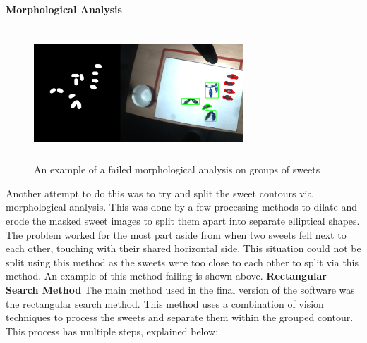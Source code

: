 \textbf{Morphological Analysis}
\newline
\newline
\captionsetup[figure]{justification=centering}
\begin{figure}[H]
        \centering 
        \includegraphics[width=0.7\textwidth, height=5cm]{morphellipse.png}
        \caption{An example of a failed morphological analysis on groups of sweets}
        \label{fig:morphAnalysis}
\end{figure}
Another attempt to do this was to try and split the sweet contours via morphological analysis. This was done by a few processing methods to dilate and erode the masked sweet images to split them apart into separate elliptical shapes. The problem worked for the most part aside from when two sweets fell next to each other, touching with their shared horizontal side. This situation could not be split using this method as the sweets were too close to each other to split via this method. An example of this method failing is shown above.
\newline\newline
\textbf{Rectangular Search Method}
\newline\newline
The main method used in the final version of the software was the rectangular search method. This method uses a combination of vision techniques to process the sweets and separate them within the grouped contour. This process has multiple steps, explained below:
